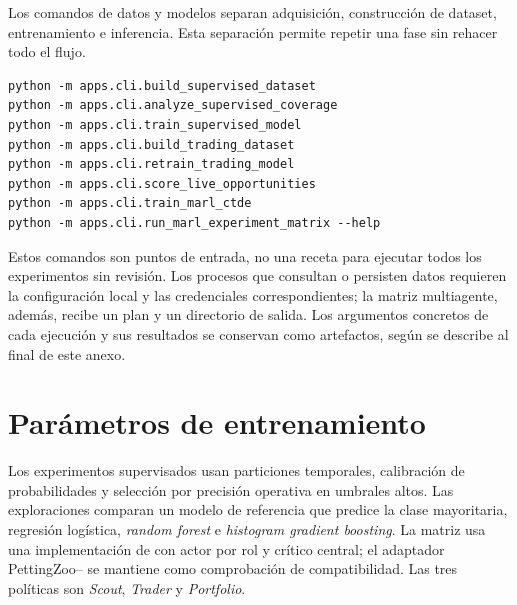 Los comandos de datos y modelos separan adquisición, construcción de dataset, entrenamiento e inferencia. Esta separación permite repetir una fase sin rehacer todo el flujo.

\begin{verbatim}
python -m apps.cli.build_supervised_dataset
python -m apps.cli.analyze_supervised_coverage
python -m apps.cli.train_supervised_model
python -m apps.cli.build_trading_dataset
python -m apps.cli.retrain_trading_model
python -m apps.cli.score_live_opportunities
python -m apps.cli.train_marl_ctde
python -m apps.cli.run_marl_experiment_matrix --help
\end{verbatim}

Estos comandos son puntos de entrada, no una receta para ejecutar todos los experimentos sin revisión. Los procesos que consultan o persisten datos requieren la configuración local y las credenciales correspondientes; la matriz multiagente, además, recibe un plan y un directorio de salida. Los argumentos concretos de cada ejecución y sus resultados se conservan como artefactos, según se describe al final de este anexo.

\section{Parámetros de entrenamiento}

Los experimentos supervisados usan particiones temporales, calibración de probabilidades y selección por precisión operativa en umbrales altos. Las exploraciones comparan un modelo de referencia que predice la clase mayoritaria, regresión logística, \emph{random forest} e \emph{histogram gradient boosting}. La matriz  usa una implementación de  con actor por rol y crítico central; el adaptador PettingZoo-- se mantiene como comprobación de compatibilidad. Las tres políticas son \textit{Scout}, \textit{Trader} y \textit{Portfolio}.

